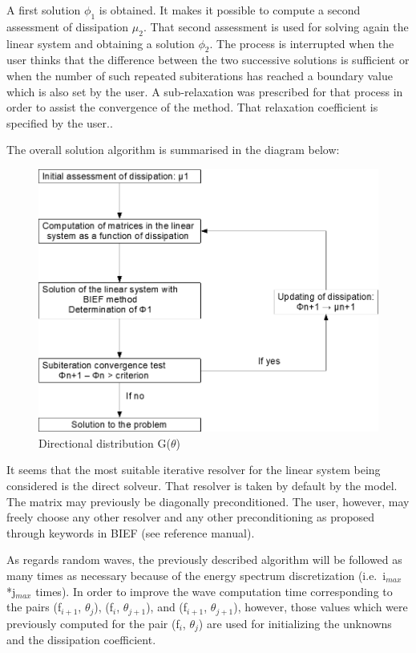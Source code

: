 A first solution $\phi_{1}$ is obtained. It makes it possible to compute a
second assessment of dissipation $\mu_{2}$. That second assessment is used for
solving again the linear system and obtaining a solution $\phi_{2}$. The
process is interrupted when the user thinks that the difference between the two
successive solutions is sufficient or when the number of such repeated
subiterations has reached a boundary value which is also set by the user. A
sub-relaxation was prescribed for that process in order to assist the
convergence of the method. That relaxation coefficient is specified by the
user..

The overall solution algorithm is summarised in the diagram below:

\begin{figure}[H]%
\begin{center}
%
  \includegraphics[width=\textwidth]{./graphics/dissipation}
%
\caption{Directional distribution G($\theta$)}\label{fig:dissipation}
\end{center}
\end{figure}

It seems that the most suitable iterative resolver for the linear system being
considered is the direct solveur. That resolver is taken by default by the
model. The matrix may previously be diagonally preconditioned. The user,
however, may freely choose any other resolver and any other preconditioning as
proposed through keywords in BIEF (see \artemis{} reference manual).

As regards random waves, the previously described algorithm will be followed as
many times as necessary because of the energy spectrum discretization (i.e.\
i${}_{max}$*j${}_{max}$ times). In order to improve the wave computation time
corresponding to the pairs (f${}_{i+1}$, $\theta_{j}$), (f${}_{i}$,
$\theta_{j+1}$), and (f${}_{i+1}$, $\theta_{j+1}$), however, those values which
were previously computed for the pair (f${}_{i}$, $\theta_{j}$) are used for
initializing the unknowns and the dissipation coefficient.

